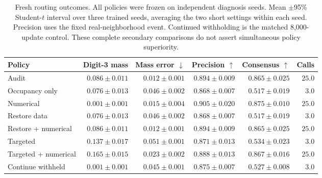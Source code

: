 \begin{table}[t]
\centering\small
\setlength{\tabcolsep}{4pt}
\caption{Fresh routing outcomes. All policies were frozen on independent diagnosis seeds. Mean $\pm$95\% Student-$t$ interval over three trained seeds, averaging the two short settings within each seed. Precision uses the fixed real-neighborhood event. Continued withholding is the matched 8,000-update control. These complete secondary comparisons do not assert simultaneous policy superiority.}
\label{tab:mnist_routing_policies}
\begin{tabular}{lrrrrr}
\toprule
Policy & Digit-3 mass & Mass error $\downarrow$ & Precision $\uparrow$ & Consensus $\uparrow$ & Calls \\
\midrule
Audit & $0.086\pm0.011$ & $0.012\pm0.001$ & $0.894\pm0.009$ & $0.865\pm0.025$ & $25.0$ \\
Occupancy only & $0.076\pm0.013$ & $0.046\pm0.002$ & $0.868\pm0.007$ & $0.517\pm0.019$ & $3.0$ \\
Numerical & $0.001\pm0.001$ & $0.015\pm0.004$ & $0.905\pm0.020$ & $0.875\pm0.010$ & $25.0$ \\
Restore data & $0.076\pm0.013$ & $0.046\pm0.002$ & $0.868\pm0.007$ & $0.517\pm0.019$ & $3.0$ \\
Restore + numerical & $0.086\pm0.011$ & $0.012\pm0.001$ & $0.894\pm0.009$ & $0.865\pm0.025$ & $25.0$ \\
Targeted & $0.137\pm0.017$ & $0.051\pm0.001$ & $0.871\pm0.013$ & $0.534\pm0.023$ & $3.0$ \\
Targeted + numerical & $0.165\pm0.015$ & $0.023\pm0.002$ & $0.888\pm0.013$ & $0.867\pm0.016$ & $25.0$ \\
Continue withheld & $0.001\pm0.001$ & $0.045\pm0.001$ & $0.875\pm0.007$ & $0.527\pm0.008$ & $3.0$ \\
\bottomrule
\end{tabular}
\end{table}
